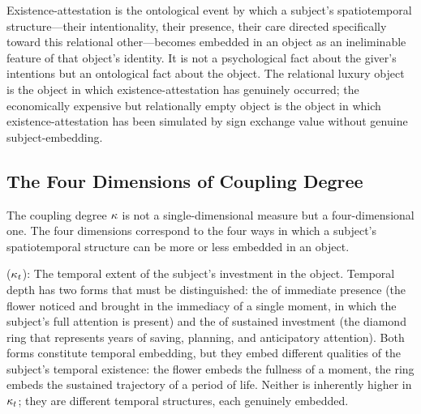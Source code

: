 \begin{claim}
Existence-attestation is the ontological event by which a subject's spatiotemporal structure---their intentionality, their presence, their care directed specifically toward this relational other---becomes embedded in an object as an ineliminable feature of that object's identity. It is not a psychological fact about the giver's intentions but an ontological fact about the object. The relational luxury object is the object in which existence-attestation has genuinely occurred; the economically expensive but relationally empty object is the object in which existence-attestation has been simulated by sign exchange value without genuine subject-embedding.
\end{claim}

\subsection{The Four Dimensions of Coupling Degree}
\label{p16:subsec:four_dimensions}

\noindent
The coupling degree $\kappa$ is not a single-dimensional measure but a four-dimensional one. The four dimensions correspond to the four ways in which a subject's spatiotemporal structure can be more or less embedded in an object.

 ($\kappa_t$): The temporal extent of the subject's investment in the object. Temporal depth has two forms that must be distinguished: the  of immediate presence (the flower noticed and brought in the immediacy of a single moment, in which the subject's full attention is present) and the  of sustained investment (the diamond ring that represents years of saving, planning, and anticipatory attention). Both forms constitute temporal embedding, but they embed different qualities of the subject's temporal existence: the flower embeds the fullness of a moment, the ring embeds the sustained trajectory of a period of life. Neither is inherently higher in $\kappa_t$; they are different temporal structures, each genuinely embedded.

